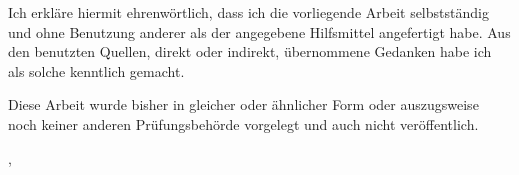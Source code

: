 
Ich erkläre hiermit ehrenwörtlich, dass ich die vorliegende Arbeit selbstständig und ohne Benutzung anderer als der angegebene Hilfsmittel angefertigt habe. Aus den benutzten Quellen, direkt oder indirekt, übernommene Gedanken habe ich als solche kenntlich gemacht.

Diese Arbeit wurde bisher in gleicher oder ähnlicher Form oder auszugsweise noch keiner anderen Prüfungsbehörde vorgelegt und auch nicht veröffentlich.

\vspace{5em}


\autor, \datumAbgabe